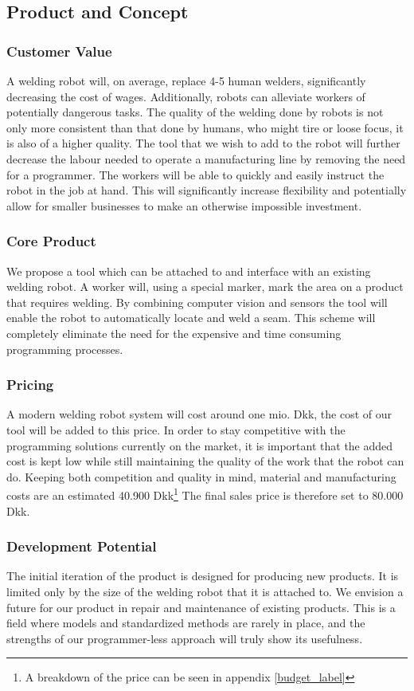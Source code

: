 \subsection{Product and Concept}

\subsubsection{Customer Value}
A welding robot will, on average, replace 4-5 human welders, significantly decreasing the cost of wages. Additionally, robots can alleviate workers of potentially dangerous tasks. The quality of the welding done by robots is not only more consistent than that done by humans, who might tire or loose focus, it is also of a higher quality. The tool that we wish to add to the robot will further decrease the labour needed to operate a manufacturing line by removing the need for a programmer. The workers will be able to quickly and easily instruct the robot in the job at hand. This will significantly increase flexibility and potentially allow for smaller businesses to make an otherwise impossible investment.

\subsubsection{Core Product}
We propose a tool which can be attached to and interface with an existing welding robot. 
A worker will, using a special marker, mark the area on a product that requires welding. By combining computer vision and sensors the tool will enable the robot to automatically locate and weld a seam. This scheme will completely eliminate the need for the expensive and time consuming programming processes.

\subsubsection{Pricing}
A modern welding robot system will cost around one mio. Dkk, the cost of our tool will be added to this price. In order to stay competitive with the programming solutions currently on the market, it is important that the added cost is kept low while still maintaining the quality of the work that the robot can do. Keeping both competition and quality in mind, material and manufacturing costs are an estimated 40.900 Dkk\footnote{A breakdown of the price can be seen in appendix \ref{budget_label}} 
The final sales price is therefore set to 80.000 Dkk.

\subsubsection{Development Potential}
The initial iteration of the product is designed for producing new products. It is limited only by the size of the welding robot that it is attached to. We envision a future for our product in repair and maintenance of existing products. This is a field where models and standardized methods are rarely in place, and the strengths of our programmer-less approach will truly show its usefulness.

